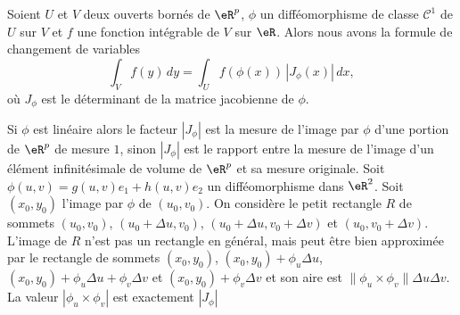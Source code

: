 \begin{theorem}		\label{ThoChmVarInt}
  Soient $U$ et $V$ deux ouverts bornés de $\eR^p$, $\phi$ un difféomorphisme de classe $\mathcal{C}^1$ de $U$ sur $V$ et $f$ une fonction intégrable de $V$ sur $\eR$. Alors nous avons la formule de changement de variables 
  \begin{equation}
    \int_{V}f(y)\, dy= \int_{U} f(\phi(x))\, \left| J_{\phi}(x)\right|\, dx,
  \end{equation}
  où $J_{\phi}$ est le déterminant de la matrice jacobienne de $\phi$. 
\end{theorem}
Si $\phi$ est linéaire  alors le facteur $|J_{\phi}|$ est la mesure de l'image par $\phi$ d'une portion de $\eR^p$ de mesure $1$, sinon  $|J_{\phi}|$ est le rapport entre la mesure de l'image d'un élément infinitésimale de volume de $\eR^p$ et sa mesure originale. 
Soit $\phi(u,v)=g(u,v)e_1+h(u,v)e_2$ un difféomorphisme dans $\eR^2$. Soit $(x_0, y_0)$ l'image par $\phi$ de $(u_0,v_0)$. On considère le petit rectangle $R$ de sommets $(u_0,v_0)$, $(u_0+\Delta u,v_0)$, $(u_0+\Delta u,v_0+\Delta v)$ et $(u_0,v_0+\Delta v)$. L'image de $R$ n'est pas un rectangle en général, mais peut être bien approximée par le rectangle de sommets $(x_0,y_0)$, $(x_0 ,y_0)+ \phi_{u}\Delta u$, $(x_0 ,y_0)+\phi_{u}\Delta u +\phi_{v}\Delta v$ et  $(x_0 ,y_0)+ \phi_{v}\Delta v$ et son aire est $\| \phi_{u}\times \phi_{v}\| \Delta u\Delta v$. La valeur $|\phi_{u}\times \phi_{v}|$ est exactement $|J_{\phi}|$ 

